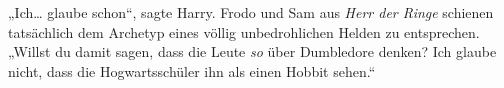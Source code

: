 „Ich… glaube schon“, sagte Harry.
Frodo und Sam aus \emph{Herr der Ringe} schienen tatsächlich dem Archetyp eines völlig unbedrohlichen Helden zu entsprechen.
„Willst du damit sagen, dass die Leute \emph{so} über Dumbledore denken? Ich glaube nicht, dass die Hogwartsschüler ihn als einen Hobbit sehen.“

